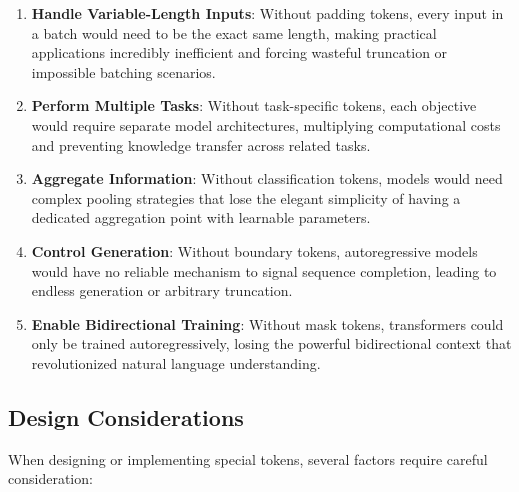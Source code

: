 \begin{enumerate}
\item \textbf{Handle Variable-Length Inputs}: Without padding tokens, every input in a batch would need to be the exact same length, making practical applications incredibly inefficient and forcing wasteful truncation or impossible batching scenarios.

\item \textbf{Perform Multiple Tasks}: Without task-specific tokens, each objective would require separate model architectures, multiplying computational costs and preventing knowledge transfer across related tasks.

\item \textbf{Aggregate Information}: Without classification tokens, models would need complex pooling strategies that lose the elegant simplicity of having a dedicated aggregation point with learnable parameters.

\item \textbf{Control Generation}: Without boundary tokens, autoregressive models would have no reliable mechanism to signal sequence completion, leading to endless generation or arbitrary truncation.

\item \textbf{Enable Bidirectional Training}: Without mask tokens, transformers could only be trained autoregressively, losing the powerful bidirectional context that revolutionized natural language understanding.
\end{enumerate}
\begin{comment}
Feedback: This list is a great summary. To avoid it being just a dry list, you could frame it as "Without special tokens, transformers would struggle to..." For example: "1. Handle variable-length inputs: Without padding tokens, every input in a batch would need to be the exact same length, making practical applications incredibly inefficient." This reframing emphasizes their problem-solving nature.

STATUS: addressed - reframed entire section to emphasize problem-solving nature with "Without special tokens, transformers would struggle" framing
\end{comment}

\subsection{Design Considerations}

When designing or implementing special tokens, several factors require careful consideration:

